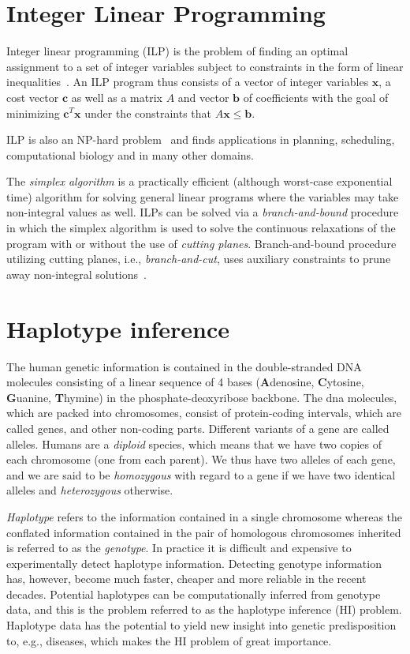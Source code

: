 \documentclass[12pt,a4paper]{article}
\begin{document}
\section{Integer Linear Programming}
Integer linear programming (ILP) is the problem of finding an optimal assignment to a set of integer variables subject to constraints in the form of linear inequalities~\cite{DBLP:books/ph/PapadimitriouS82}.
An ILP program thus consists of a vector of integer variables $\mathbf{x}$, a cost vector $\mathbf{c}$ as well as a matrix $A$ and vector $\mathbf{b}$ of coefficients with the goal of minimizing $\mathbf{c}^T \mathbf{x}$ under the constraints that $A\mathbf{x} \leq \mathbf{b}$.

ILP is also an NP-hard problem~\cite{DBLP:conf/coco/Karp72} and finds applications in planning, scheduling, computational biology and in many other domains.

The \emph{simplex algorithm} is a practically efficient (although worst-case exponential time) algorithm for solving general linear programs where the variables may take non-integral values as well.
ILPs can be solved via a \emph{branch-and-bound} procedure in which the simplex algorithm is used to solve the continuous relaxations of the program with or without the use of \emph{cutting planes}.
Branch-and-bound procedure utilizing cutting planes, i.e., \emph{branch-and-cut}, uses auxiliary constraints to prune away non-integral solutions~\cite{DBLP:books/ph/PapadimitriouS82}.


\section{Haplotype inference}
The human genetic information is contained in the double-stranded DNA molecules consisting of a linear sequence of 4 bases (\textbf{A}denosine, \textbf{C}ytosine, \textbf{G}uanine, \textbf{T}hymine) in the phosphate-deoxyribose backbone.
The dna molecules, which are packed into chromosomes, consist of protein-coding intervals, which are called genes, and other non-coding parts.
Different variants of a gene are called alleles.
Humans are a \emph{diploid} species, which means that we have two copies of each chromosome (one from each parent).
We thus have two alleles of each gene, and we are said to be \emph{homozygous} with regard to a gene if we have two identical alleles and \emph{heterozygous} otherwise.

\emph{Haplotype} refers to the information contained in a single chromosome whereas the conflated information contained in the pair of  homologous chromosomes inherited is referred to as the \emph{genotype}.
In practice it is difficult and expensive to experimentally detect haplotype information.
Detecting genotype information has, however, become much faster, cheaper and more reliable in the recent decades.
Potential haplotypes can be computationally inferred from genotype data, and this is the problem referred to as the haplotype inference (HI) problem.
Haplotype data has the potential to yield new insight into genetic predisposition to, e.g., diseases, which makes the HI problem of great importance.
\end{document}
